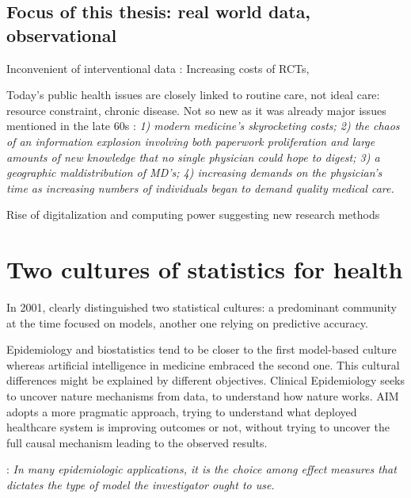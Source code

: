\documentclass{report}
\begin{document}
\subsection{Focus of this thesis: real world data, observational}\label{subsec:intro:focus_data}

Inconvenient of interventional data : Increasing costs of RCTs,

Today's public health issues are closely linked to routine care, not ideal care:
resource constraint, chronic disease. Not so new as it was already major issues
mentioned in the late 60s \cite{rutstein1967coming}: \textit{1) modern
  medicine's skyrocketing costs; 2) the chaos of an information explosion
  involving both paperwork proliferation and large amounts of new knowledge that
  no single physician could hope to digest; 3) a geographic maldistribution of
  MD's; 4) increasing demands on the physician's time as increasing numbers of
  individuals began to demand quality medical care.}

Rise of digitalization and computing power suggesting new research methods

\section{Two cultures of statistics for health}\label{sec:intro:two_cultures}

In 2001, \cite{breiman2001statistical} clearly distinguished two statistical
cultures: a predominant community at the time focused on models, another one
relying on predictive accuracy.

Epidemiology and biostatistics tend to be closer to the first model-based culture
whereas artificial intelligence in medicine embraced the second one. This
cultural differences might be explained by different objectives. Clinical
Epidemiology seeks to uncover nature mechanisms from data, to understand how
nature works. AIM adopts a more pragmatic approach, trying to understand what
deployed healthcare system is improving outcomes or not, without trying to
uncover the full causal mechanism leading to the observed results.

\citep{rothman2012epidemiology}: \textit{In many epidemiologic applications, it is the choice among effect
  measures that dictates the type of model the investigator ought to use.}
\end{document}
